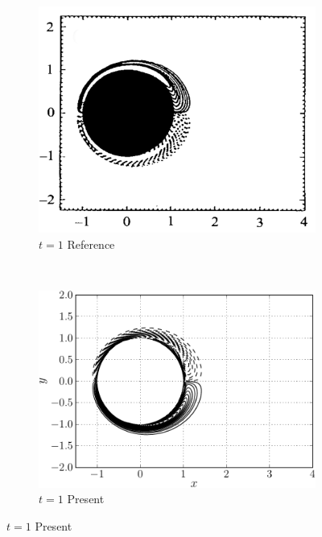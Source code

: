 	\begin{figure}[p]
     \centering
     \begin{subfigure}[t]{0.45\textwidth}
             \includegraphics[height=0.2\textheight]{figures/eulerian/ISC_vorticityContours_t1_ref-mod.png}
             \caption{$t=1$ Reference}
             \label{fig:ISC_vorticityContours_t1_ref}
     \end{subfigure}%
     ~ %
     \begin{subfigure}[t]{0.45\textwidth}
             \includegraphics[height=0.2\textheight]{figures/eulerian/ISC_vorticityContours_t1-crop.pdf}
             \caption{$t=1$ Present}
             \label{fig:ISC_vorticityContours_t1-crop}
     \end{subfigure}
     

\end{figure}
